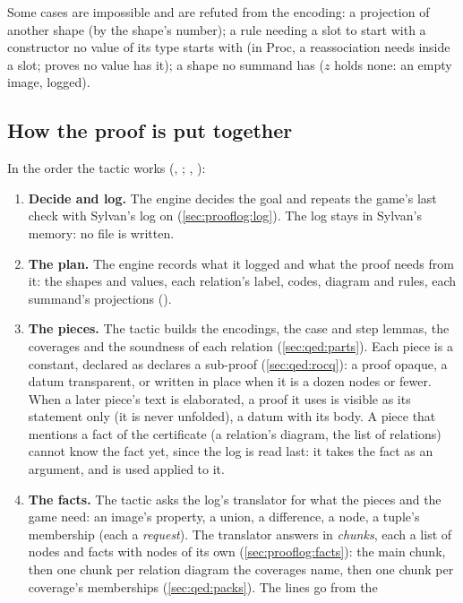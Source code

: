 Some cases are impossible and are refuted from the encoding: a
projection of another shape (by the shape's number); a rule needing a
slot to start with a constructor no value of its type starts with (in
Proc, a reassociation needs  inside a slot;
 proves no value has it); a shape no summand has
($z$ holds none: an empty image, logged).

\subsection{How the proof is put together}\label{sec:qed:assembly}

In the order the tactic works (,
; , ):
\begin{enumerate}
\item \textbf{Decide and log.} The engine decides the goal and repeats
  the game's last check with Sylvan's log on (\cref{sec:prooflog:log}).
  The log stays in Sylvan's memory: no file is written.
\item \textbf{The plan.} The engine records what it logged and what the
  proof needs from it: the shapes and values, each relation's label,
  codes, diagram and rules, each summand's projections
  ().
\item \textbf{The pieces.} The tactic builds the encodings, the case
  and step lemmas, the coverages and the soundness of each relation
  (\cref{sec:qed:parts}). Each piece is a constant, declared as
   declares a sub-proof (\cref{sec:qed:rocq}): a proof
  opaque, a datum transparent, or written in place when it is a dozen
  nodes or fewer. When a later piece's text is elaborated, a proof it uses
  is visible as its statement only (it is never unfolded), a datum with
  its body. A piece that mentions a fact of the certificate (a relation's
  diagram, the list of relations) cannot know the fact yet, since the log
  is read last: it takes the fact as an argument, and is used applied to
  it.
\item \textbf{The facts.} The tactic asks the log's translator for what
  the pieces and the game need: an image's property, a union, a
  difference, a node, a tuple's membership (each a \emph{request}). The
  translator answers in \emph{chunks}, each a list of nodes and facts
  with nodes of its own (\cref{sec:prooflog:facts}): the main chunk, then
  one chunk per relation diagram the coverages name, then one chunk per
  coverage's memberships (\cref{sec:qed:packs}). The lines go from the

\end{enumerate}
